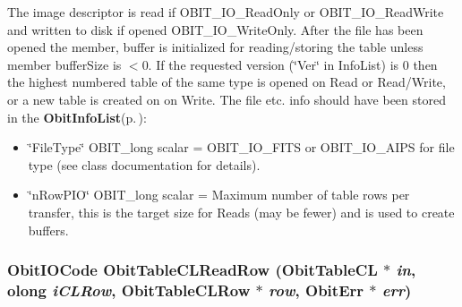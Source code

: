 The image descriptor is read if OBIT\_\-IO\_\-Read\-Only or OBIT\_\-IO\_\-Read\-Write and written to disk if opened OBIT\_\-IO\_\-Write\-Only. After the file has been opened the member, buffer is initialized for reading/storing the table unless member buffer\-Size is $<$0. If the requested version (\char`\"{}Ver\char`\"{} in Info\-List) is 0 then the highest numbered table of the same type is opened on Read or Read/Write, or a new table is created on on Write. The file etc. info should have been stored in the {\bf Obit\-Info\-List}{\rm (p.\,\pageref{structObitInfoList})}: \begin{itemize}
\item \char`\"{}File\-Type\char`\"{} OBIT\_\-long scalar = OBIT\_\-IO\_\-FITS or OBIT\_\-IO\_\-AIPS for file type (see class documentation for details). \item \char`\"{}n\-Row\-PIO\char`\"{} OBIT\_\-long scalar = Maximum number of table rows per transfer, this is the target size for Reads (may be fewer) and is used to create buffers. 
\end{itemize}
\subsubsection{\setlength{\rightskip}{0pt plus 5cm}Obit\-IOCode Obit\-Table\-CLRead\-Row ({\bf Obit\-Table\-CL} $\ast$ {\em in}, {\bf olong} {\em i\-CLRow}, {\bf Obit\-Table\-CLRow} $\ast$ {\em row}, {\bf Obit\-Err} $\ast$ {\em err})}\label{ObitTableCL_8c_a22}


